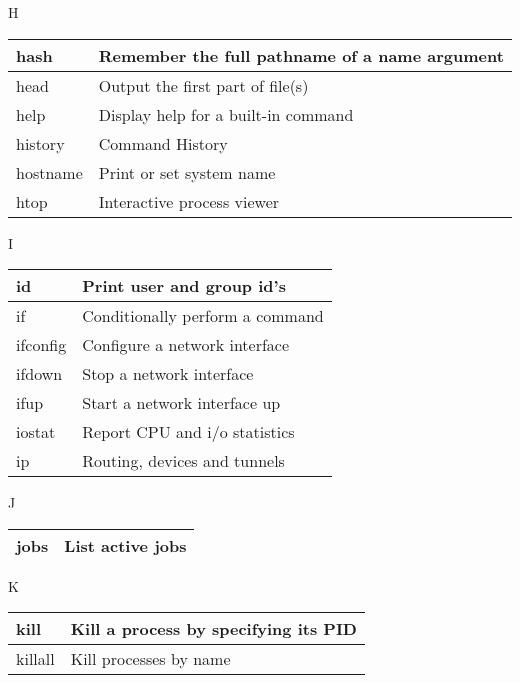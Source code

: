 \begin{flushleft}
\begin{tcolorbox}
	\textsc{H}
\end{tcolorbox}

\begin{tabular}{lp{12cm}}
	\hline
	hash &	Remember the full pathname of a name argument \\
	\hline
	head &	Output the first part of file(s) \\
	\hline
	help &	Display help for a built-in command \\
	\hline
	history &	Command History \\
	\hline
	hostname &	Print or set system name \\
	\hline
	htop &	Interactive process viewer \\
	\hline
\end{tabular}

\begin{tcolorbox}
	\textsc{I}
\end{tcolorbox}

\begin{tabular}{lp{12cm}}
	\hline
	id &	Print user and group id's \\
	\hline
	if &	Conditionally perform a command \\
	\hline
	ifconfig &	Configure a network interface \\
	\hline
	ifdown &	Stop a network interface \\
	\hline
	ifup &	Start a network interface up \\
	\hline
	iostat &	Report CPU and i/o statistics \\
	\hline
	ip &	Routing, devices and tunnels \\
	\hline
\end{tabular}

\newpage

\begin{tcolorbox}
	\textsc{J}
\end{tcolorbox}

\begin{tabular}{lp{12cm}}
	\hline
	jobs &	List active jobs \\
	\hline
\end{tabular}



\begin{tcolorbox}
	\textsc{K}
\end{tcolorbox}

\begin{tabular}{lp{12cm}}
	\hline
	kill &	Kill a process by specifying its PID \\
	\hline
	killall &	Kill processes by name \\
	\hline
\end{tabular}




\end{flushleft}
